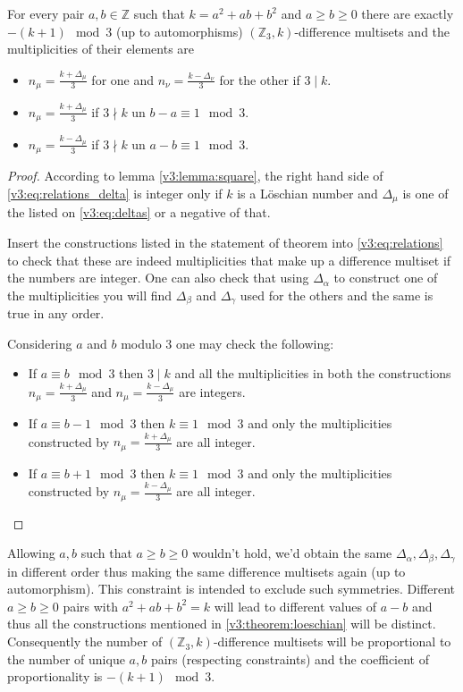 \begin{theorem}
	\label{v3:theorem:loeschian}
	For every pair $a,b \in \mathbb Z$ such that $k=a^2+ab+b^2$ and $a \geq b \geq 0$ there are exactly $-(k+1) \mod 3$ (up to automorphisms) $(\mathbb Z_3,k)$-difference multisets and the multiplicities of their elements are
	
	\begin{itemize}
		\item $n_\mu=\frac{k+\Delta_\mu}{3}$ for one and $n_\nu=\frac{k-\Delta_\nu}{3}$ for the other if $3 \mid k$.
		\item $n_\mu=\frac{k+\Delta_\mu}{3}$ if $3 \nmid k$ un $b-a \equiv 1 \mod 3$.
		\item $n_\mu=\frac{k-\Delta_\mu}{3}$ if $3 \nmid k$ un $a-b \equiv 1 \mod 3$.
	\end{itemize}
\end{theorem}

\begin{proof}
	According to lemma \ref{v3:lemma:square}, the right hand side of \eqref{v3:eq:relations_delta} is integer only if $k$ is a Löschian number and $\Delta_\mu$ is one of the listed on \eqref{v3:eq:deltas} or a negative of that.
	
	Insert the constructions listed in the statement of theorem into \eqref{v3:eq:relations} to check that these are indeed multiplicities that make up a difference multiset if the numbers are integer. One can also check that using $\Delta_\alpha$ to construct one of the multiplicities you will find $\Delta_\beta$ and $\Delta_\gamma$ used for the others and the same is true in any order.
	
	Considering $a$ and $b$ modulo $3$ one may check the following:
	\begin{itemize}
		\item If $a \equiv b \mod 3$ then $3 \mid k$ and all the multiplicities in both the constructions $n_\mu=\frac{k+\Delta_\mu}{3}$ and $n_\mu=\frac{k-\Delta_\mu}{3}$ are integers.
		\item If $a \equiv b-1 \mod 3$ then $k \equiv 1 \mod 3$ and only the multiplicities constructed by $n_\mu=\frac{k+\Delta_\mu}{3}$ are all integer.
		\item If $a \equiv b+1 \mod 3$ then $k \equiv 1 \mod 3$ and only the multiplicities constructed by $n_\mu=\frac{k-\Delta_\mu}{3}$ are all integer.
	\end{itemize}
\end{proof}

\begin{remark}
	Allowing $a,b$ such that $a \geq b \geq 0$ wouldn't hold, we'd obtain the same $\Delta_\alpha, \Delta_\beta, \Delta_\gamma$ in different order thus making the same difference multisets again (up to automorphism). This constraint is intended to exclude such symmetries.
	Different $a \geq b \geq 0$ pairs with $a^2+ab+b^2=k$ will lead to different values of $a-b$ and thus all the constructions mentioned in \ref{v3:theorem:loeschian} will be distinct. Consequently the number of $(\mathbb Z_3,k)$-difference multisets will be proportional to the number of unique $a,b$ pairs (respecting constraints) and the coefficient of proportionality is $-(k+1) \mod 3$.
\end{remark}

